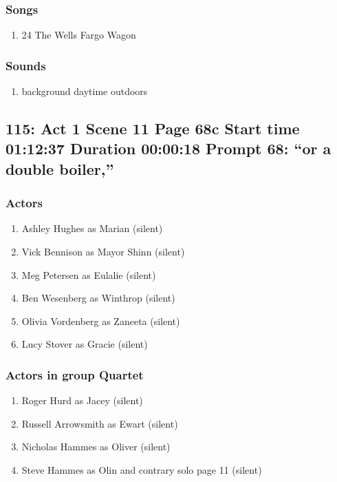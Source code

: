\subsubsection{Songs}
\begin{enumerate}
\item 24 The Wells Fargo Wagon
\end{enumerate}\subsubsection{Sounds}
\begin{enumerate}
\item background daytime outdoors
\end{enumerate}
\subsection{115: Act 1 Scene 11 Page 68c Start time 01:12:37 Duration 00:00:18 Prompt 68: ``or a double boiler,''}

\subsubsection{Actors}
\begin{enumerate}
\item Ashley Hughes as Marian (silent)
\item Vick Bennison as Mayor Shinn (silent)
\item Meg Petersen as Eulalie (silent)
\item Ben Wesenberg as Winthrop (silent)
\item Olivia Vordenberg as Zaneeta (silent)
\item Lucy Stover as Gracie (silent)
\end{enumerate}
\subsubsection{Actors in group Quartet}
\begin{enumerate}
\item Roger Hurd as Jacey (silent)
\item Russell Arrowsmith as Ewart (silent)
\item Nicholas Hammes as Oliver (silent)
\item Steve Hammes as Olin and contrary solo page 11 (silent)
\end{enumerate}
